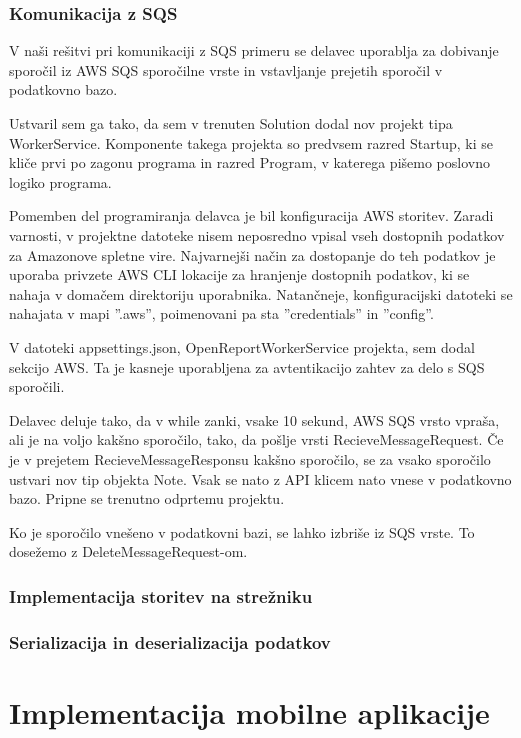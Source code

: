 \documentclass[a4paper, 12pt]{book}
\begin{document}
\subsubsection{Komunikacija z SQS}

V naši rešitvi pri komunikaciji z SQS 
primeru se delavec uporablja za dobivanje sporočil iz AWS SQS sporočilne vrste in vstavljanje prejetih sporočil v podatkovno bazo.

Ustvaril sem ga tako, da sem v trenuten Solution dodal nov projekt tipa WorkerService.
Komponente takega projekta so predvsem razred Startup, ki se kliče prvi po zagonu programa in razred Program, v katerega pišemo poslovno logiko programa.

Pomemben del programiranja delavca je bil konfiguracija AWS storitev.
Zaradi varnosti, v projektne datoteke nisem neposredno vpisal vseh dostopnih podatkov za Amazonove spletne vire.
Najvarnejši način za dostopanje do teh podatkov je uporaba privzete AWS CLI lokacije za hranjenje dostopnih podatkov, ki se nahaja v domačem direktoriju uporabnika.
Natančneje, konfiguracijski datoteki se nahajata v mapi ''.aws'', poimenovani pa sta ''credentials'' in ''config''.

V datoteki appsettings.json, OpenReportWorkerService projekta, sem dodal sekcijo AWS.
Ta je kasneje uporabljena za avtentikacijo zahtev za delo s SQS sporočili.

Delavec deluje tako, da v while zanki, vsake 10 sekund, AWS SQS vrsto vpraša, ali je na voljo kakšno sporočilo, tako, da pošlje vrsti RecieveMessageRequest. 
Če je v prejetem RecieveMessageResponsu kakšno sporočilo, se za vsako sporočilo ustvari nov tip objekta Note.
Vsak se nato z API klicem nato vnese v podatkovno bazo.
Pripne se trenutno odprtemu projektu.

Ko je sporočilo vnešeno v podatkovni bazi, se lahko izbriše iz SQS vrste.
To dosežemo z DeleteMessageRequest-om.

\subsubsection{Implementacija storitev na strežniku}


\subsubsection{Serializacija in deserializacija podatkov}

\section{Implementacija mobilne aplikacije}
\end{document}
